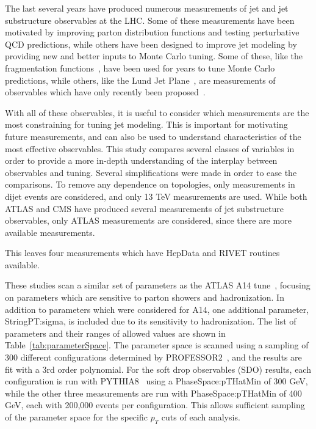 The last several years have produced numerous measurements of jet and jet substructure observables at the LHC. 
Some of these measurements have been motivated by improving parton distribution functions and testing perturbative QCD predictions, 
while others have been designed to improve jet modeling by providing new and better inputs to Monte Carlo tuning.
Some of these, like the fragmentation functions~\cite{Aad:2019onw}, have been used for years to tune Monte Carlo predictions, 
while others, like the Lund Jet Plane~\cite{lundAtlas}, are measurements of observables which have only recently been proposed~\cite{lundPlane}.

With all of these observables, it is useful to consider which measurements are the most constraining for tuning jet modeling.
This is important for motivating future measurements, and can also be used to understand characteristics of the most effective observables.
This study compares several classes of variables in order to provide a more in-depth understanding of the interplay between observables and tuning.
Several simplifications were made in order to ease the comparisons. 
To remove any dependence on topologies, only measurements in dijet events are considered, and only 13 TeV measurements are used.
While both ATLAS and CMS have produced several measurements of jet substructure observables, only ATLAS measurements are considered, since there are more available measurements.

This leaves four measurements which have HepData and RIVET routines available.


These studies scan a similar set of parameters as the ATLAS A14 tune~\cite{ATL-PHYS-PUB-2014-021}, focusing on parameters which are sensitive to parton showers and hadronization.
In addition to parameters which were considered for A14, one additional parameter, StringPT:sigma, is included due to its sensitivity to hadronization.
The list of parameters and their ranges of allowed values are shown in Table~\ref{tab:parameterSpace}.
The parameter space is scanned using a sampling of 300 different configurations determined by PROFESSOR2~\cite{professor}, and the results are fit with a 3rd order polynomial.
For the soft drop observables (SDO) results, each configuration is run with PYTHIA8~\cite{pythia} using a PhaseSpace:pTHatMin of 300 GeV, 
while the other three measurements are run with PhaseSpace:pTHatMin of 400 GeV, each with 200,000 events per configuration. 
This allows sufficient sampling of the parameter space for the specific $p_{T}$ cuts of each analysis. 

